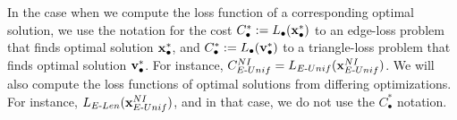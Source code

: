 In the case when we compute the loss function of a corresponding optimal solution, we use the notation for the cost $C_\bullet^* := L_\bullet(\mathbf{x}_\bullet^*)$ to an edge-loss problem that finds optimal solution $\mathbf{x}_\bullet^*$, and $C_\bullet^* := L_\bullet(\mathbf{v}_\bullet^*)$ to a triangle-loss problem that finds optimal solution $\mathbf{v}_\bullet^*$. For instance, $C_{E\text{-}Unif}^{NI}=L_{E\text{-}Unif}(\mathbf{x}_{E\text{-}Unif}^{NI})$. We will also compute the loss functions of optimal solutions from differing optimizations. For instance, $L_{E\text{-}Len}(\mathbf{x}_{E\text{-}Unif}^{NI})$, and in that case, we do not use the $C_\bullet^*$ notation.





















